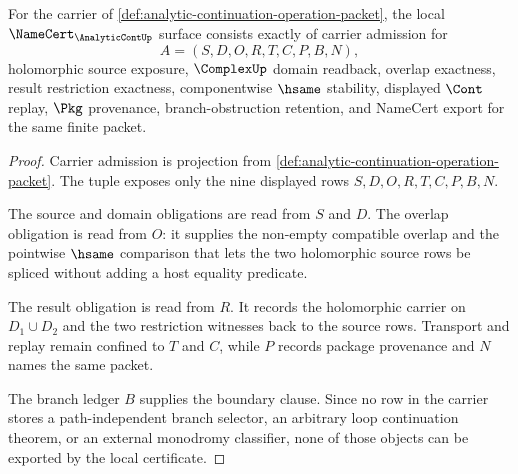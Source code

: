 \begin{theorem}
\label{thm:analytic-continuation-operation-obligations}
For the carrier of \autoref{def:analytic-continuation-operation-packet}, the local $\NameCert_{\AnalyticContUp}$ surface consists exactly of carrier admission for
$$
A=(S,D,O,R,T,C,P,B,N),
$$
holomorphic source exposure, $\ComplexUp$ domain readback, overlap exactness, result restriction exactness, componentwise $\hsame$ stability, displayed $\Cont$ replay, $\Pkg$ provenance, branch-obstruction retention, and NameCert export for the same finite packet.
\end{theorem}
\begin{proof}
Carrier admission is projection from \autoref{def:analytic-continuation-operation-packet}. The tuple exposes only the nine displayed rows $S,D,O,R,T,C,P,B,N$.

The source and domain obligations are read from $S$ and $D$. The overlap obligation is read from $O$: it supplies the non-empty compatible overlap and the pointwise $\hsame$ comparison that lets the two holomorphic source rows be spliced without adding a host equality predicate.

The result obligation is read from $R$. It records the holomorphic carrier on $D_1\cup D_2$ and the two restriction witnesses back to the source rows. Transport and replay remain confined to $T$ and $C$, while $P$ records package provenance and $N$ names the same packet.

The branch ledger $B$ supplies the boundary clause. Since no row in the carrier stores a path-independent branch selector, an arbitrary loop continuation theorem, or an external monodromy classifier, none of those objects can be exported by the local certificate.
\end{proof}

